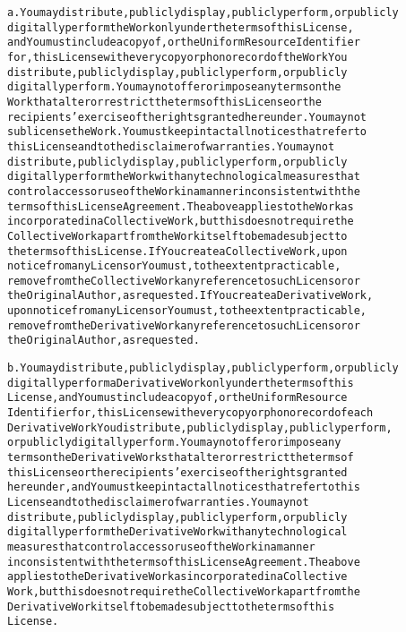 \documentclass{report}
\begin{document}
\begin{alltt}
a. You may distribute, publicly display, publicly perform, or publicly
   digitally perform the Work only under the terms of this License,
   and You must include a copy of, or the Uniform Resource Identifier
   for, this License with every copy or phonorecord of the Work You
   distribute, publicly display, publicly perform, or publicly
   digitally perform. You may not offer or impose any terms on the
   Work that alter or restrict the terms of this License or the
   recipients' exercise of the rights granted hereunder. You may not
   sublicense the Work. You must keep intact all notices that refer to
   this License and to the disclaimer of warranties. You may not
   distribute, publicly display, publicly perform, or publicly
   digitally perform the Work with any technological measures that
   control access or use of the Work in a manner inconsistent with the
   terms of this License Agreement. The above applies to the Work as
   incorporated in a Collective Work, but this does not require the
   Collective Work apart from the Work itself to be made subject to
   the terms of this License. If You create a Collective Work, upon
   notice from any Licensor You must, to the extent practicable,
   remove from the Collective Work any reference to such Licensor or
   the Original Author, as requested. If You create a Derivative Work,
   upon notice from any Licensor You must, to the extent practicable,
   remove from the Derivative Work any reference to such Licensor or
   the Original Author, as requested.

b. You may distribute, publicly display, publicly perform, or publicly
   digitally perform a Derivative Work only under the terms of this
   License, and You must include a copy of, or the Uniform Resource
   Identifier for, this License with every copy or phonorecord of each
   Derivative Work You distribute, publicly display, publicly perform,
   or publicly digitally perform. You may not offer or impose any
   terms on the Derivative Works that alter or restrict the terms of
   this License or the recipients' exercise of the rights granted
   hereunder, and You must keep intact all notices that refer to this
   License and to the disclaimer of warranties. You may not
   distribute, publicly display, publicly perform, or publicly
   digitally perform the Derivative Work with any technological
   measures that control access or use of the Work in a manner
   inconsistent with the terms of this License Agreement. The above
   applies to the Derivative Work as incorporated in a Collective
   Work, but this does not require the Collective Work apart from the
   Derivative Work itself to be made subject to the terms of this
   License.


\end{alltt}
\end{document}
